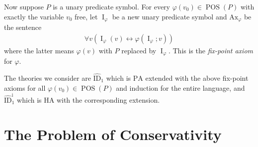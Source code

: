 \documentclass{scrartcl}
\theoremstyle{definition}
\theoremstyle{plain}
\theoremstyle{remark}
\newcommand{\liff}{\leftrightarrow}
\renewcommand{\=}{=\!\!\!=}
\newcommand{\PA}{\ensuremath{\mathrm{PA}}}
\DeclareMathOperator{\I}{I}
\DeclareMathOperator{\POS}{POS}
\newcommand{\ID}[2][]{\ensuremath{\widehat{\mathrm{ID}}_{#2}^{#1}}}
\newcommand{\IID}[1]{\ensuremath{\widehat{\mathrm{ID}}_{#1}^{\mathrm{i}}{}}}
\newcommand{\HA}{\ensuremath{\mathrm{HA}}}
\newcommand{\Ax}{\ensuremath{\mathrm{Ax}}}
\begin{document}
Now suppose $P$ is a unary predicate symbol. For every $\varphi(v_0) \in \POS(P)$ with exactly the variable $v_0$ free, let $\I_{\varphi}$ be a new unary predicate symbol and $\Ax_{\varphi}$ be the sentence
\begin{align}
  \forall v (\I_{\varphi}(v) \liff \varphi(\I_{\varphi};v)) \label{eq:Iax}\tag{$\dagger$}
\end{align}
where the latter means $\varphi(v)$ with $P$ replaced by $\I_{\varphi}$. This is the \emph{fix-point axiom} for $\varphi$.

The theories we consider are $\ID1$ which is $\PA$ extended with the above fix-point axioms for all $\varphi(v_0) \in \POS(P)$ and induction for the entire language, and $\IID1$ which is $\HA$ with the corresponding extension.

\section{The Problem of Conservativity}
\label{sec:problem}
\end{document}
